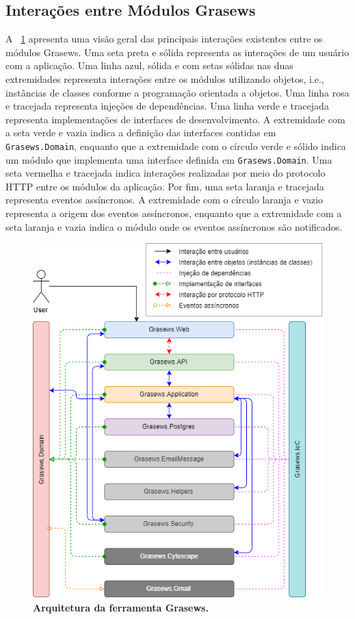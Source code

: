 \subsection{Interações entre Módulos Grasews}\label{4-grasews-interacoes-modulos}

A \figurename~\ref{fig:grasews-architecture-simplified} apresenta uma visão geral das principais interações existentes entre os módulos Grasews. Uma seta preta e sólida representa as interações de um usuário com a aplicação. Uma linha azul, sólida e com setas sólidas nas duas extremidades representa interações entre os módulos utilizando objetos, i.e., instâncias de classes conforme a programação orientada a objetos. Uma linha rosa e tracejada representa injeções de dependências. Uma linha verde e tracejada representa implementações de interfaces de desenvolvimento. A extremidade com a seta verde e vazia indica a definição das interfaces contidas em \texttt{Grasews.Domain}, enquanto que a extremidade com o círculo verde e sólido indica um módulo que implementa uma interface definida em \texttt{Grasews.Domain}. Uma seta vermelha e tracejada indica interações realizadas por meio do protocolo HTTP entre os módulos da aplicação. Por fim, uma seta laranja e tracejada representa eventos assíncronos. A extremidade com o círculo laranja e vazio representa a origem dos eventos assíncronos, enquanto que a extremidade com a seta laranja e vazia indica o módulo onde os eventos assíncronos são notificados.

\begin{figure}[h]
    \includegraphics[scale=0.55]{4-grasews/imagens/grasews-architecture-simplified.png}
    \centering
    \caption[Arquitetura da ferramenta Grasews]{\textbf{Arquitetura da ferramenta Grasews.}}
    \label{fig:grasews-architecture-simplified}
\end{figure}

